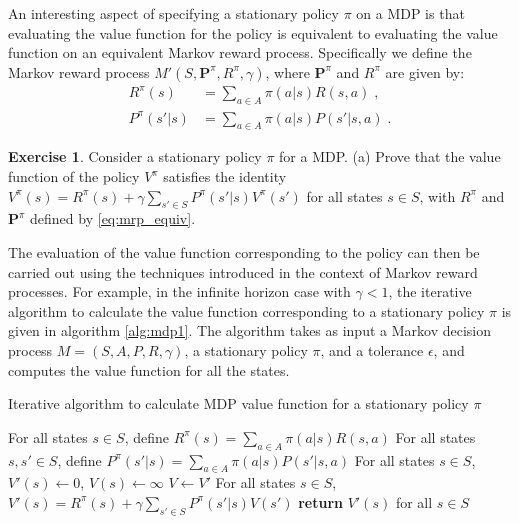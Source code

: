 \documentclass{article}
\theoremstyle{definition}
\newtheorem{exercise}{Exercise}[section]
\theoremstyle{remark}
\begin{document}
An interesting aspect of specifying a stationary policy $\pi$ on a MDP is that evaluating the value function for the policy is equivalent to evaluating the value function on an equivalent Markov reward process. Specifically we define the Markov reward process $M'(S,\mathbf{P}^{\pi},R^{\pi},\gamma)$, where $\mathbf{P}^{\pi}$ and $R^{\pi}$ are given by:
\begin{equation}
\begin{split}
R^{\pi}(s) &= \sum_{a \in A} \pi(a|s) R(s,a) \;, \\
P^{\pi}(s'|s) &= \sum_{a \in A} \pi(a|s) P(s'|s,a) \;.
\end{split}
\label{eq:mrp_equiv}
\end{equation}

\begin{exercise}
Consider a stationary policy $\pi$ for a MDP. (a) Prove that the value function of the policy $V^{\pi}$ satisfies the identity $V^{\pi}(s) = R^{\pi}(s) + \gamma \sum_{s' \in S} P^{\pi}(s'|s) V^{\pi}(s')$ for all states $s \in S$, with $R^{\pi}$ and $\mathbf{P}^{\pi}$ defined by \eqref{eq:mrp_equiv}.
\label{ex-s-valuefunc_mdp_identity_stationary}
\end{exercise}

The evaluation of the value function corresponding to the policy can then be carried out using the techniques introduced in the context of Markov reward processes. For example, in the infinite horizon case with $\gamma < 1$, the iterative algorithm to calculate the value function corresponding to a stationary policy $\pi$ is given in algorithm \ref{alg:mdp1}. The algorithm takes as input a Markov decision process $M = (S,A,P,R,\gamma)$, a stationary policy $\pi$, and a tolerance $\epsilon$, and computes the value function for all the states.

\begin{algorithm}
\caption{Iterative algorithm to calculate MDP value function for a stationary policy $\pi$}\label{alg:mdp1}
\begin{algorithmic}[1]
\State For all states $s \in S$, define $R^{\pi}(s) = \sum_{a \in A} \pi(a|s) R(s,a)$
\State For all states $s,s' \in S$, define $P^{\pi}(s'|s) = \sum_{a \in A} \pi(a|s) P(s'|s,a)$
\State For all states $s \in S$, $V'(s)\gets 0$, $V(s) \gets \infty$
\State $V \gets V'$
\State For all states $s \in S$, $V'(s) = R^{\pi}(s) + \gamma \sum_{s' \in S} P^{\pi}(s'|s)V(s')$
\EndWhile\label{mdp1label}
\State \textbf{return} $V'(s)$ for all $s \in S$
\EndProcedure
\end{algorithmic}
\end{algorithm}
\end{document}
